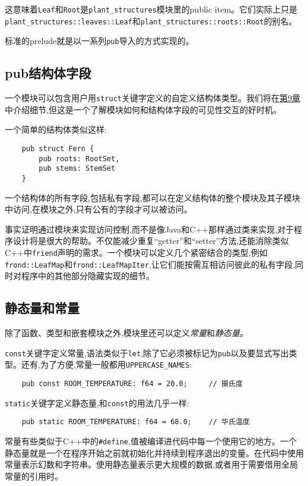 这意味着\texttt{Leaf}和\texttt{Root}是\texttt{plant\_structures}模块里的public item。它们实际上只是\\
\texttt{plant\_structures::leaves::Leaf}和\texttt{plant\_structures::roots::Root}的别名。

标准的prelude就是以一系列\texttt{pub}导入的方式实现的。

\subsection{pub结构体字段}
一个模块可以包含用户用\texttt{struct}关键字定义的自定义结构体类型。我们将在\hyperref[ch09]{第9章}中介绍细节,但这是一个了解模块如何和结构体字段的可见性交互的好时机。

一个简单的结构体类似这样:
\begin{verbatim}
    pub struct Fern {
        pub roots: RootSet,
        pub stems: StemSet
    }
\end{verbatim}

一个结构体的所有字段,包括私有字段,都可以在定义结构体的整个模块及其子模块中访问,在模块之外,只有公有的字段才可以被访问。

事实证明通过模块来实现访问控制,而不是像Java和C++那样通过类来实现,对于程序设计将是很大的帮助。不仅能减少重复“getter”和“setter”方法,还能消除类似C++中\texttt{friend}声明的需求。一个模块可以定义几个紧密结合的类型,例如\texttt{frond::LeafMap}和\texttt{frond::LeafMapIter},让它们能按需互相访问彼此的私有字段,同时对程序中的其他部分隐藏实现的细节。

\subsection{静态量和常量}\label{static}

除了函数、类型和嵌套模块之外,模块里还可以定义\emph{常量}和\emph{静态量}。

\texttt{const}关键字定义常量,语法类似于\texttt{let},除了它必须被标记为\texttt{pub}以及要显式写出类型。还有,为了方便,常量一般都用\texttt{UPPERCASE\_NAMES}:
\begin{verbatim}
    pub const ROOM_TEMPERATURE: f64 = 20.0;     // 摄氏度
\end{verbatim}

\texttt{static}关键字定义静态量,和\texttt{const}的用法几乎一样:
\begin{verbatim}
    pub static ROOM_TEMPERATURE: f64 = 68.0;    // 华氏温度
\end{verbatim}

常量有些类似于C++中的\texttt{\#define},值被编译进代码中每一个使用它的地方。一个静态量就是一个在程序开始之前就初始化并持续到程序退出的变量。在代码中使用常量表示幻数和字符串。使用静态量表示更大规模的数据,或者用于需要借用全局常量的引用时。

